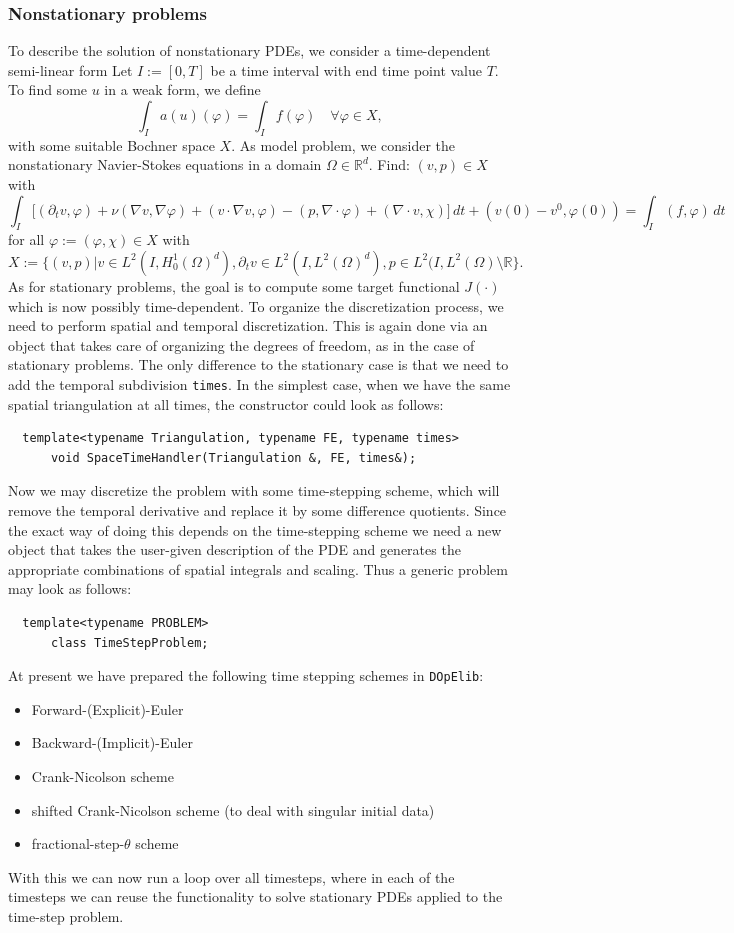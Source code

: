 \documentclass[prodmode,acmtoms]{acmsmall}
\numberwithin{equation}{section}
\renewcommand{\phi}{\varphi}
\newcommand{\dope}{\texttt{DOpElib}}
\begin{document}
\subsubsection{Nonstationary problems}\label{sec:timedep}
To describe the solution of nonstationary 
PDEs, we consider a time-dependent semi-linear form
Let $I:=[0,T]$ be a time interval with end time point value $T$.
To find some $u$ in a weak form, we define
\[
\int_I a(u)(\phi) = \int_I f(\phi) \quad \forall\phi\in X,
\]
with some suitable Bochner space $X$.  As model problem,
we consider the nonstationary Navier-Stokes equations
in a domain $\Omega\in\mathbb{R}^d$. Find: 
$(v,p)\in X$ with
\[
\int_I \bigl[ (\partial_t v, \phi)
+ \nu (\nabla v, \nabla \phi) + (v\cdot\nabla v, \phi)
- (p,\nabla\cdot \phi)
+ (\nabla\cdot v, \chi)\bigr] \, dt
+ (v(0) - v^0, \phi(0))
= \int_I (f,\phi) \, dt 
\]
for all $\phi:= (\phi, \chi) \in X$ with
\[
X:= \bigl\{ 
(v,p) | v\in L^2(I,H_0^1(\Omega)^d) , 
\partial_t v\in L^2(I, L^2(\Omega)^d), 
p\in L^2(I,L^2(\Omega)\setminus\mathbb{R} \bigr\}.
\]
As for stationary problems, the goal is to compute
some target functional $J(\cdot)$ which is now possibly 
time-dependent. To organize the discretization 
process, we need to perform spatial and temporal 
discretization. This is again done via
an object that takes care of organizing the degrees of 
freedom, as in the case of stationary problems.
The only difference to the stationary case is that we need to 
add the temporal subdivision \texttt{times}. In the simplest 
case, when we have the same spatial triangulation 
at all times, the constructor could look as follows:
\begin{lstlisting}
  template<typename Triangulation, typename FE, typename times>
      void SpaceTimeHandler(Triangulation &, FE, times&);
\end{lstlisting}

Now we may discretize the problem with some time-stepping scheme, which will 
remove the temporal derivative and replace it by some difference quotients. 
Since the exact way of doing this depends on the time-stepping scheme 
we need a new object that takes the user-given description of the PDE and 
generates the appropriate combinations of spatial integrals and scaling.
Thus a generic problem may look as follows:
\begin{lstlisting}
  template<typename PROBLEM>
      class TimeStepProblem;
\end{lstlisting}
At present we have prepared the following time stepping schemes in \dope:
\begin{itemize}
\item Forward-(Explicit)-Euler
\item Backward-(Implicit)-Euler
\item Crank-Nicolson scheme
\item shifted Crank-Nicolson scheme (to deal with singular initial data)
\item fractional-step-$\theta$ scheme
\end{itemize}
With this we can now run a loop over all timesteps, where in each of the 
timesteps we can reuse the functionality to solve stationary PDEs 
applied to the time-step problem. 
\end{document}
